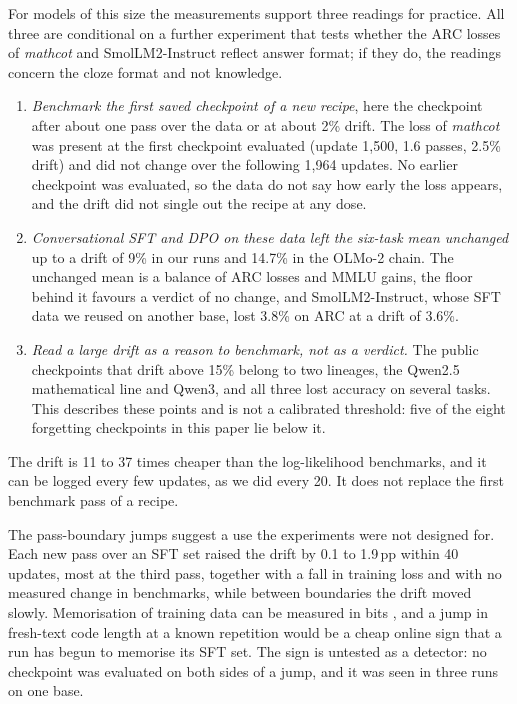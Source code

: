 \documentclass[11pt,a4paper]{article}
\theoremstyle{definition}
\newcommand{\mathcot}{\textit{mathcot}}
\newcommand{\pp}{\,pp}
\begin{document}
For models of this size the measurements support three readings for practice. All three are conditional on a
further experiment that tests whether the ARC losses of \mathcot{} and SmolLM2-Instruct reflect answer format; if
they do, the readings concern the cloze format and not knowledge.
\begin{enumerate}
\item \emph{Benchmark the first saved checkpoint of a new recipe}, here the checkpoint after about one pass over
the data or at about 2\% drift. The loss of \mathcot{} was present at the first checkpoint evaluated (update
1,500, 1.6 passes, 2.5\% drift) and did not change over the following 1,964 updates. No earlier checkpoint was
evaluated, so the data do not say how early the loss appears, and the drift did not single out the recipe at any
dose.
\item \emph{Conversational SFT and DPO on these data left the six-task mean unchanged} up to a drift of 9\% in our
runs and 14.7\% in the OLMo-2 chain. The unchanged mean is a balance of ARC losses and MMLU gains, the floor
behind it favours a verdict of no change, and SmolLM2-Instruct, whose SFT data we reused on another base, lost
3.8\% on ARC at a drift of 3.6\%.
\item \emph{Read a large drift as a reason to benchmark, not as a verdict.} The public checkpoints that drift
above 15\% belong to two lineages, the Qwen2.5 mathematical line and Qwen3, and all three lost accuracy on several
tasks. This describes these points and is not a calibrated threshold: five of the eight forgetting checkpoints in
this paper lie below it.
\end{enumerate}
The drift is 11 to 37 times cheaper than the log-likelihood benchmarks, and it can be logged every few updates, as
we did every 20. It does not replace the first benchmark pass of a recipe.

The pass-boundary jumps suggest a use the experiments were not designed for. Each new pass over an SFT set raised
the drift by 0.1 to 1.9\pp{} within 40 updates, most at the third pass, together with a fall in training loss and
with no measured change in benchmarks, while between boundaries the drift moved slowly. Memorisation of training
data can be measured in bits \citep{morris2025memorize}, and a jump in fresh-text code length at a known
repetition would be a cheap online sign that a run has begun to memorise its SFT set. The sign is untested as a
detector: no checkpoint was evaluated on both sides of a jump, and it was seen in three runs on one base.
\end{document}
